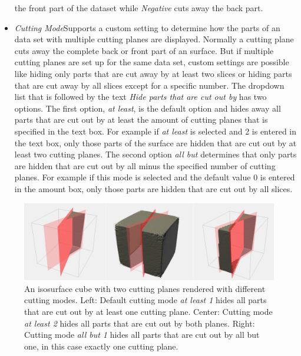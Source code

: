 \begin{itemize}
{  the front part of the dataset while \emph{Negative} cuts away the back part.}
  \item{\emph{Cutting Mode}\newline Supports a custom setting to determine how the parts of an data set with multiple
  cutting planes are displayed. Normally a cutting plane cuts away the complete back or front part of an surface.
  But if multiple cutting planes are set up for the same data set, custom settings are possible like hiding only parts that are cut
  away by at least two slices or hiding parts that are cut away by all slices except for a specific number.
  The dropdown list that is followed by the text \emph{Hide parts that are cut out by} has two options.\newline
  The first option, \emph{at least}, is the default option and hides away all parts that are
  cut out by at least the amount of cutting planes that is specified in the text box. For example
  if \emph{at least} is selected and 2 is entered in the text box, only those parts of the surface are hidden that are cut out by
  at least two cutting planes.\newline
  The second option \emph{all but} determines that only parts are hidden that are cut out by all minus the specified number of cutting planes.
  For example if this mode is selected and the default value 0 is entered in the amount box, only those parts are hidden that are cut out
  by all slices.}
\end{itemize}

\begin{figure}[h!]
  \centering
  \includegraphics[width=1.0\textwidth]{img/cuttingplane_modes.png}
  \caption{An isosurface cube with two cutting planes rendered with different cutting modes.\newline
  Left: Default cutting mode \emph{at least 1} hides all parts that are cut out by at least one cutting plane.\newline
  Center: Cutting mode \emph{at least 2} hides all parts that are cut out by both planes.
  \newline
  Right: Cutting mode \emph{all but 1} hides all parts that are cut out by all but one, in this case exactly one cutting plane.}
  \label{fig:cuttingplane_modes}
\end{figure}

